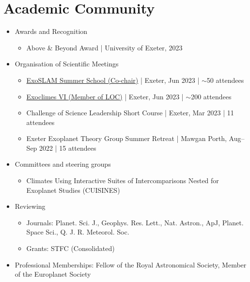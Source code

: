 \documentclass[a4paper, 11pt]{article}
\begin{document}
\section{Academic Community}
\begin{itemize}[nosep, leftmargin=10pt]
    \item Awards and Recognition
    \begin{itemize}
        \item Above \& Beyond Award | University of Exeter, 2023
    \end{itemize}
    \item Organisation of Scientific Meetings
    \begin{itemize}
        \item \href{https://exoclimes.org/exoslam/index.html}{ExoSLAM Summer School (Co-chair)} | Exeter, Jun 2023 | $\sim$50 attendees
        \item \href{https://exoclimes.org}{Exoclimes VI (Member of LOC)} | Exeter, Jun 2023 | $\sim$200 attendees
        \item Challenge of Science Leadership Short Course | Exeter, Mar 2023 | 11 attendees
        \item Exeter Exoplanet Theory Group Summer Retreat | Mawgan Porth, Aug--Sep 2022 | 15 attendees
    \end{itemize}
    \item Committees and steering groups
    \begin{itemize}
        \item Climates Using Interactive Suites of Intercomparisons Nested for Exoplanet Studies (CUISINES)
    \end{itemize}
    \item Reviewing
    \begin{itemize}
        \item Journals: Planet. Sci. J., Geophys. Res. Lett., Nat. Astron., ApJ, Planet. Space Sci., Q. J. R. Meteorol. Soc.
        \item Grants: STFC (Consolidated)
    \end{itemize}
    \item Professional Memberships: Fellow of the Royal Astronomical Society, Member of the Europlanet Society
\end{itemize}
\end{document}

